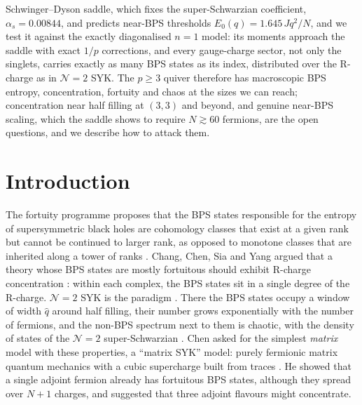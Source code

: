 \documentclass[10pt]{article}
\begin{document}
\begin{center}
\begin{minipage}{0.95\textwidth}
Schwinger--Dyson saddle, which fixes the super-Schwarzian coefficient, $\alpha_s=0.00844$, and predicts near-BPS
thresholds $E_0(q)=1.645\,Jq^2/N$, and we test it against the exactly diagonalised $n=1$ model: its moments approach
the saddle with exact $1/p$ corrections, and every gauge-charge sector, not only the singlets, carries exactly as many
BPS states as its index, distributed over the R-charge as in $\mathcal N=2$ SYK. The $p\ge3$ quiver therefore has
macroscopic BPS entropy, concentration, fortuity and chaos at the sizes we can reach; concentration near half filling
at $(3,3)$ and beyond, and genuine near-BPS scaling, which the saddle shows to require $N\gtrsim60$ fermions, are the
open questions, and we describe how to attack them.
\end{minipage}\end{center}
\vspace{8pt}

\section{Introduction}\label{sec:intro}

The fortuity programme proposes that the BPS states responsible for the entropy of supersymmetric black holes are
cohomology classes that exist at a given rank but cannot be continued to larger rank, as opposed to monotone
classes that are inherited along a tower of ranks \cite{ChangLin}. Chang, Chen, Sia and Yang argued that a theory
whose BPS states are mostly fortuitous should exhibit R-charge concentration \cite{CCSY}: within each complex, the
BPS states sit in a single degree of the R-charge. $\mathcal N=2$ SYK is the paradigm \cite{FGMS}. There the BPS
states occupy a window of width $\hat q$ around half filling, their number grows exponentially with the number of
fermions, and the non-BPS spectrum next to them is chaotic, with the density of states of the $\mathcal N=2$
super-Schwarzian \cite{TW}. Chen asked for the simplest \emph{matrix} model with these properties, a ``matrix SYK''
model: purely fermionic matrix quantum mechanics with a cubic supercharge built from traces \cite{Chen}. He showed
that a single adjoint fermion already has fortuitous BPS states, although they spread over $N+1$ charges, and
suggested that three adjoint flavours might concentrate.
\end{document}
